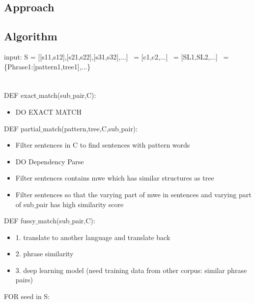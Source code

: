 \subsection{Approach}

 

\subsection{Algorithm}
     input: S = [[s11,s12],[s21,s22],[s31,s32],...]
     \ = [c1,c2,...]
     \ = [SL1,SL2,...]
     \ = \{Phrase1:[pattern1,tree1],...\}
     \\\\
     \\DEF exact$\_$match(sub$\_$pair,C):
        \begin{itemize}
         \item DO EXACT MATCH
         \end{itemize}
     DEF partial$\_$match(pattern,tree,C,sub$\_$pair):
     \begin{itemize}
      \item    Filter sentences in C to find sentences with pattern words
        \item DO Dependency Parse
        \item Filter sentences contains mwe which has similar structures as tree
         \item Filter sentences so that the varying part of mwe in sentences and varying part of sub$\_$pair has high similarity score
       \end{itemize}
     DEF fussy$\_$match(sub$\_$pair,C):
      \begin{itemize}
       \item 1. translate to another language and translate back
         \item 2. phrase similarity
         \item 3. deep learning model (need training data from other corpus: similar phrase pairs)
      \end{itemize}  
     FOR seed in S:
